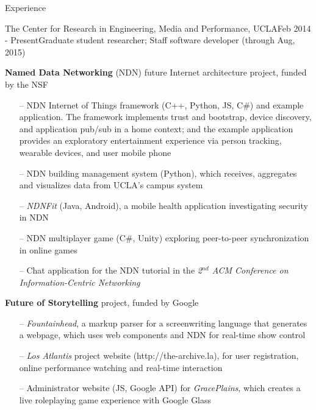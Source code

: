 \documentclass{resume} %
\begin{document}
\begin{rSection}{Experience}

\begin{rSubsection}{The Center for Research in Engineering, Media and Performance, UCLA}{Feb 2014 - Present}{Graduate student researcher; Staff software developer (through Aug, 2015)}{}
\item \textbf{Named Data Networking} (NDN) future Internet architecture project, funded by the NSF

\begin{itemize}[noitemsep,topsep=-6pt,leftmargin=1em]
\item[--] NDN Internet of Things framework (C++, Python, JS, C\#) and example application. The framework implements trust and bootstrap, device discovery, and application pub/sub in a home context; and the example application provides an exploratory entertainment experience via person tracking, wearable devices, and user mobile phone
\item[--] NDN building management system (Python), which receives, aggregates and visualizes data from UCLA's campus system
\item[--] \textit{NDNFit} (Java, Android), a mobile health application investigating security in NDN
\item[--] NDN multiplayer game (C\#, Unity) exploring peer-to-peer synchronization in online games
\item[--] Chat application for the NDN tutorial in the \textit{2$^{nd}$ ACM Conference on Information-Centric Networking}
\end{itemize}

\item \textbf{Future of Storytelling} project, funded by Google

\begin{itemize}[noitemsep,topsep=-6pt,leftmargin=1em]
\item[--] \textit{Fountainhead}, a markup parser for a screenwriting language that generates a webpage, which uses web components and NDN for real-time show control
\item[--] \textit{Los Atlantis} project website (http://the-archive.la), for user registration, online performance watching and real-time interaction
\item[--] Administrator website (JS, Google API) for \textit{GracePlains}, which creates a live roleplaying game experience with Google Glass
\end{itemize}


\end{rSubsection}
\end{rSection}
\end{document}
